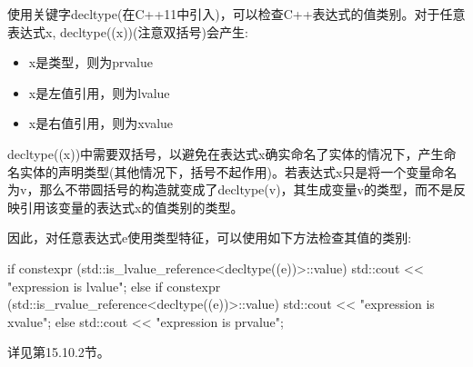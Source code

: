 使用关键字decltype(在C++11中引入)，可以检查C++表达式的值类别。对于任意表达式x, decltype((x))(注意双括号)会产生:

\begin{itemize}
\item 
x是类型，则为prvalue

\item
x是左值引用，则为lvalue

\item
x是右值引用，则为xvalue
\end{itemize}

decltype((x))中需要双括号，以避免在表达式x确实命名了实体的情况下，产生命名实体的声明类型(其他情况下，括号不起作用)。若表达式x只是将一个变量命名为v，那么不带圆括号的构造就变成了decltype(v)，其生成变量v的类型，而不是反映引用该变量的表达式x的值类别的类型。

因此，对任意表达式e使用类型特征，可以使用如下方法检查其值的类别:

\begin{cpp}
if constexpr (std::is_lvalue_reference<decltype((e))>::value) {
	std::cout << "expression is lvalue\n";
}
else if constexpr (std::is_rvalue_reference<decltype((e))>::value) {
	std::cout << "expression is xvalue\n";
}
else {
	std::cout << "expression is prvalue\n";
}
\end{cpp}

详见第15.10.2节。







